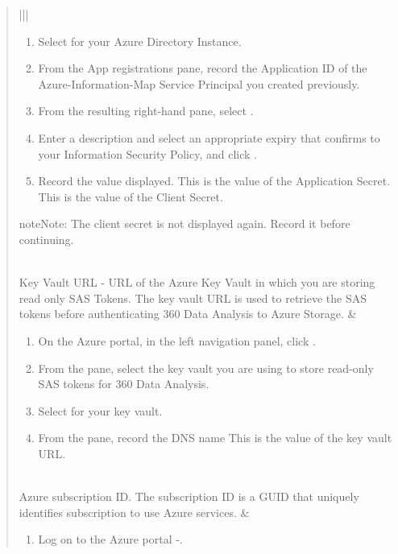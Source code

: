 \documentclass[letterpaper,10pt,english]{sphinxmanual}
\begin{document}
\begin{quote}
\begin{savenotes}
\begin{tabular}[t]{|*{2}{|}}
\begin{enumerate}
\item {} 
Select  for your Azure Directory
Instance.

\item {} 
From the App registrations pane, record the
Application ID of the Azure-Information-Map Service
Principal you created previously.

\item {} 
From the resulting right-hand pane, select .

\item {} 
Enter a description and select an appropriate expiry
that confirms to your Information Security Policy,
and click .

\item {} 
Record the value displayed. This is the value of the
Application Secret. This is the value of the Client
Secret.

\end{enumerate}

\begin{sphinxadmonition}{note}{Note:}
The client secret is not displayed again.
Record it before continuing.
\end{sphinxadmonition}
\\
\hline
Key Vault URL - URL of the Azure Key
Vault in which you are storing read
only SAS Tokens. The key vault URL is
used to retrieve the SAS tokens
before authenticating 360 Data Analysis
to Azure Storage.
&\begin{enumerate}
\item {} 
On the Azure portal, in the left navigation
panel, click .

\item {} 
From the  pane, select the key vault
you are using to store read-only SAS tokens for
360 Data Analysis.

\item {} 
Select  for your key vault.

\item {} 
From the  pane, record the DNS name
This is the value of the key vault URL.

\end{enumerate}
\\
\hline
Azure subscription ID. The subscription
ID is a GUID that uniquely identifies
subscription to use Azure services.
&\begin{enumerate}
\item {} 
Log on to the Azure portal -.


\end{enumerate}
\end{tabular}
\end{savenotes}
\end{quote}
\end{document}
